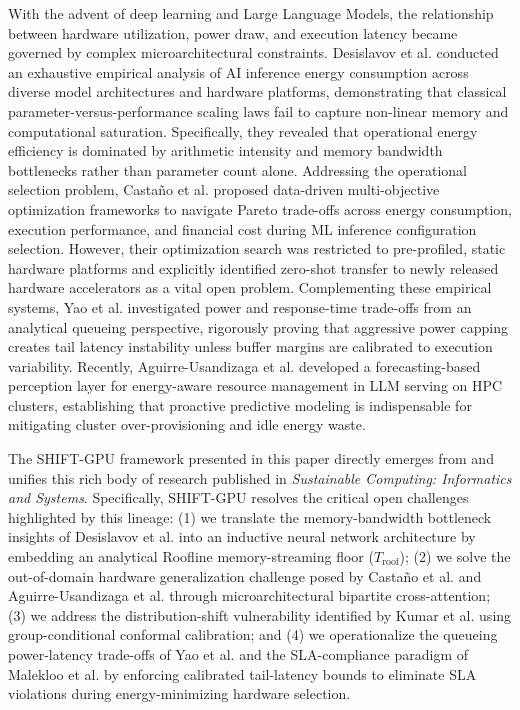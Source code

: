 \documentclass[preprint,12pt]{elsarticle}
\begin{document}
With the advent of deep learning and Large Language Models, the relationship between hardware utilization, power draw, and execution latency became governed by complex microarchitectural constraints. Desislavov et al. \citep{suscom_desislavov2023} conducted an exhaustive empirical analysis of AI inference energy consumption across diverse model architectures and hardware platforms, demonstrating that classical parameter-versus-performance scaling laws fail to capture non-linear memory and computational saturation. Specifically, they revealed that operational energy efficiency is dominated by arithmetic intensity and memory bandwidth bottlenecks rather than parameter count alone. Addressing the operational selection problem, Casta{\~n}o et al. \citep{suscom_multiobj2026} proposed data-driven multi-objective optimization frameworks to navigate Pareto trade-offs across energy consumption, execution performance, and financial cost during ML inference configuration selection. However, their optimization search was restricted to pre-profiled, static hardware platforms and explicitly identified zero-shot transfer to newly released hardware accelerators as a vital open problem. Complementing these empirical systems, Yao et al. \citep{suscom_tradeoffs2025} investigated power and response-time trade-offs from an analytical queueing perspective, rigorously proving that aggressive power capping creates tail latency instability unless buffer margins are calibrated to execution variability. Recently, Aguirre-Usandizaga et al. \citep{suscom_forecasting2026} developed a forecasting-based perception layer for energy-aware resource management in LLM serving on HPC clusters, establishing that proactive predictive modeling is indispensable for mitigating cluster over-provisioning and idle energy waste.

The SHIFT-GPU framework presented in this paper directly emerges from and unifies this rich body of research published in \textit{Sustainable Computing: Informatics and Systems}. Specifically, SHIFT-GPU resolves the critical open challenges highlighted by this lineage: (1) we translate the memory-bandwidth bottleneck insights of Desislavov et al. \citep{suscom_desislavov2023} into an inductive neural network architecture by embedding an analytical Roofline memory-streaming floor ($T_{\text{roof}}$); (2) we solve the out-of-domain hardware generalization challenge posed by Casta{\~n}o et al. \citep{suscom_multiobj2026} and Aguirre-Usandizaga et al. \citep{suscom_forecasting2026} through microarchitectural bipartite cross-attention; (3) we address the distribution-shift vulnerability identified by Kumar et al. \citep{suscom_kumar2022} using group-conditional conformal calibration; and (4) we operationalize the queueing power-latency trade-offs of Yao et al. \citep{suscom_tradeoffs2025} and the SLA-compliance paradigm of Malekloo et al. \citep{suscom_malekloo2018} by enforcing calibrated tail-latency bounds to eliminate SLA violations during energy-minimizing hardware selection.
\end{document}
